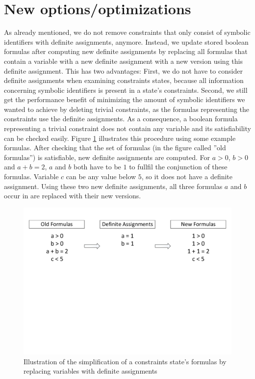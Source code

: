 \section{New options/optimizations}
\label{sec:newOptions}
 
As already mentioned, we do not remove constraints that only consist of symbolic identifiers with definite assignments, anymore.
Instead, we update stored boolean formulas after computing new definite assignments by replacing all formulas that contain a variable with a new definite assignment
with a new version using this definite assignment.
This has two advantages:
First, we do not have to consider definite assignments when examining constraints states, because all information concerning symbolic identifiers is present in a state's constraints.
Second, we still get the performance benefit of minimizing the amount of symbolic identifiers we wanted to achieve by deleting trivial constraints, as the formulas representing the constraints use the definite assignments. As a consequence, a boolean formula representing a trivial constraint does not contain any variable and its satisfiability can be checked easily.
Figure \ref{fig:formulaReplace} illustrates this procedure using some example formulas.
After checking that the set of formulas (in the figure called ''old formulas'') is satisfiable, new definite assignments are computed. For $a > 0$, $b > 0$ and $a + b = 2$, $a$ and $b$ both have to be $1$ to fullfil the conjunction of these formulas. Variable $c$ can be any value below $5$, so it does not have a definite assignment.
Using these two new definite assignments, all three formulas $a$ and $b$ occur in are replaced with their new versions.

\begin{figure}
\includegraphics[trim=0 350 0 0, clip, width=\textwidth]{implementationCpas/ReplaceFormulaVariablesWithDefAssignments}
\caption{Illustration of the simplification of a constraints state's formulas by replacing variables with definite assignments}
\label{fig:formulaReplace}
\end{figure}

